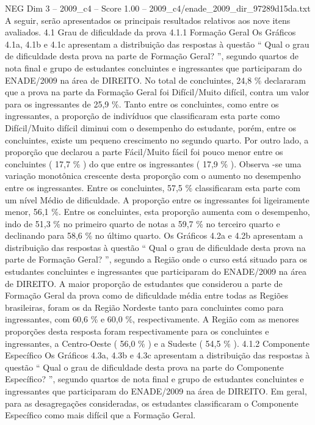 \begin{textsample}{NEG Dim 3 – 2009\_c4 – Score 1.00 – 2009\_c4/enade\_2009\_dir\_97289d15da.txt}
A seguir, serão apresentados os principais resultados relativos aos nove itens avaliados. 4.1 Grau de dificuldade da prova 4.1.1 Formação Geral Os Gráficos 4.1a, 4.1b e 4.1c apresentam a distribuição das respostas à questão “ Qual o grau de dificuldade desta prova na parte de Formação Geral? ”, segundo quartos de nota final e grupo de estudantes concluintes e ingressantes que participaram do ENADE/2009 na área de DIREITO.
No total de concluintes, 24,8 \% declararam que a prova na parte da Formação Geral foi Difícil/Muito difícil, contra um valor para os ingressantes de 25,9 \%.
Tanto entre os concluintes, como entre os ingressantes, a proporção de indivíduos que classificaram esta parte como Difícil/Muito difícil diminui com o desempenho do estudante, porém, entre os concluintes, existe um pequeno crescimento no segundo quarto.
Por outro lado, a proporção que declarou a parte Fácil/Muito fácil foi pouco menor entre os concluintes ( 17,7 \% ) do que entre os ingressantes ( 17,9 \% ).
Observa -se uma variação monotônica crescente desta proporção com o aumento no desempenho entre os ingressantes.
Entre os concluintes, 57,5 \% classificaram esta parte com um nível Médio de dificuldade.
A proporção entre os ingressantes foi ligeiramente menor, 56,1 \%.
Entre os concluintes, esta proporção aumenta com o desempenho, indo de 51,3 \% no primeiro quarto de notas a 59,7 \% no terceiro quarto e declinando para 58,6 \% no último quarto.
Os Gráficos 4.2a e 4.2b apresentam a distribuição das respostas à questão “ Qual o grau de dificuldade desta prova na parte de Formação Geral? ”, segundo a Região onde o curso está situado para os estudantes concluintes e ingressantes que participaram do ENADE/2009 na área de DIREITO.
A maior proporção de estudantes que considerou a parte de Formação Geral da prova como de dificuldade média entre todas as Regiões brasileiras, foram os da Região Nordeste tanto para concluintes como para ingressantes, com 60,6 \% e 60,0 \%, respectivamente.
A Região com as menores proporções desta resposta foram respectivamente para os concluintes e ingressantes, a Centro-Oeste ( 56,0 \% ) e a Sudeste ( 54,5 \% ). 4.1.2 Componente Específico Os Gráficos 4.3a, 4.3b e 4.3c apresentam a distribuição das respostas à questão “ Qual o grau de dificuldade desta prova na parte do Componente Específico? ”, segundo quartos de nota final e grupo de estudantes concluintes e ingressantes que participaram do ENADE/2009 na área de DIREITO.
Em geral, para as desagregações consideradas, os estudantes classificaram o Componente Específico como mais difícil que a Formação Geral.

\end{textsample}
